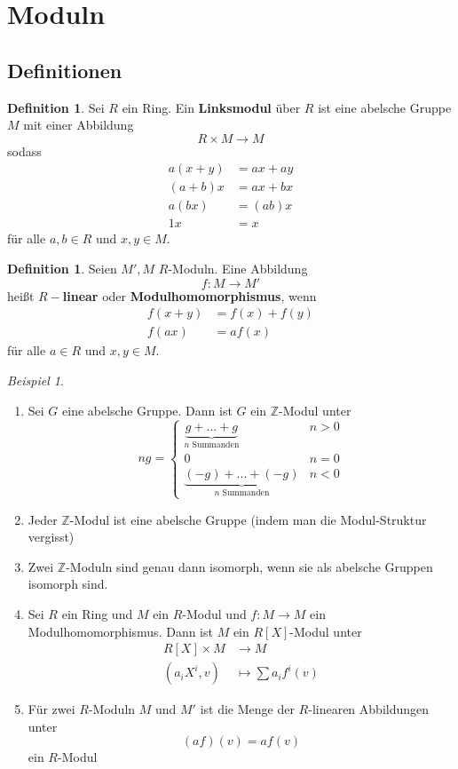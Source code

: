 \documentclass[10pt,a4paper]{article}
\newcommand{\Z}{\ensuremath{\mathbb{Z}}}
\theoremstyle{plain}
\theoremstyle{definition}
\newtheorem{definition}[theorem]{Definition}
\theoremstyle{remark}
\newtheorem{exm}[theorem]{Beispiel}
\begin{document}
	\section{Moduln}
	\subsection{Definitionen}
	\begin{definition}
		Sei $R$ ein Ring. Ein \textbf{Linksmodul} über $R$ ist eine abelsche Gruppe $M$ mit einer Abbildung
		\[R\times M\to M\]
		sodass
		\begin{align*}
		a(x+y)&=ax+ay\\
		(a+b)x&=ax+bx\\
		a(bx)&=(ab)x\\
		1x&=x
		\end{align*}
		für alle $a,b\in R$ und $x,y\in M$.
	\end{definition}

	\begin{definition}
		Seien $M',M$ $R$-Moduln. Eine Abbildung
		\[f:M\to M'\]
		heißt \textbf{$R-$linear} oder \textbf{Modulhomomorphismus}, wenn
		\begin{align*}
		f(x+y)&=f(x)+f(y)\\
		f(ax)&=af(x)
		\end{align*}
		für alle $a\in R$ und $x,y\in M$.
	\end{definition}

	\begin{exm}
		\begin{enumerate}
			\item Sei $G$ eine abelsche Gruppe. Dann ist $G$ ein $\Z$-Modul unter
			\[ng=\begin{cases}
			\underbrace{g+...+g}_{\text{$n$ Summanden}}&n>0\\
			0&n=0\\
			\underbrace{(-g)+...+(-g)}_{\text{$n$ Summanden}}&n<0
			\end{cases}\]
			\item Jeder $\Z$-Modul ist eine abelsche Gruppe (indem man die Modul-Struktur vergisst)
			\item Zwei $\Z$-Moduln sind genau dann isomorph, wenn sie als abelsche Gruppen isomorph sind.
			\item Sei $R$ ein Ring und $M$ ein $R$-Modul und $f:M\to M$ ein Modulhomomorphismus. Dann ist $M$ ein $R[X]$-Modul unter
			\begin{align*}
			R[X]\times M&\to M\\
			\left(a_iX^i,v\right)&\mapsto\sum a_if^i(v)
			\end{align*}
			\item Für zwei $R$-Moduln $M$ und $M'$ ist die Menge der $R$-linearen Abbildungen unter
			\[(a f)(v)=af(v)\]
			ein $R$-Modul
		\end{enumerate}
	\end{exm}
\end{document}
